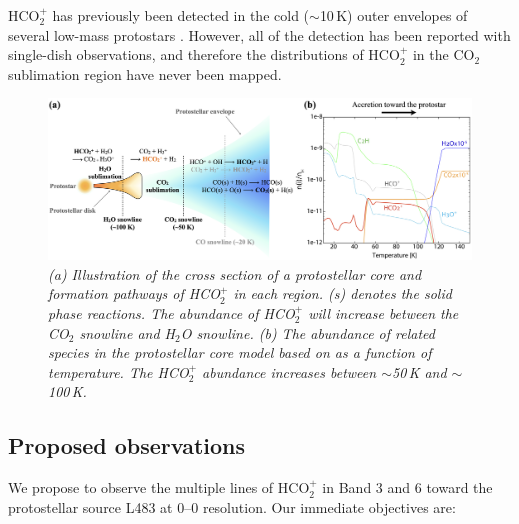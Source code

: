 \documentclass[12pt,a4paper]{article}  %
\newcommand{\carbondioxide}{CO$_2$\xspace}
\newcommand{\protonatedcarbondioxide}{HCO$_2^+$\xspace}
\newcommand{\water}{H$_2$O\xspace}
\begin{document}
\protonatedcarbondioxide has previously been detected in the cold ($\sim$10\,K) outer envelopes of several low-mass protostars \citep[e.g.,][]{Sakai08, Vastel16, Majumdar18}. However, all of the detection has been reported with single-dish observations, and therefore the distributions of \protonatedcarbondioxide in the \carbondioxide sublimation region have never been mapped.

\begin{figure}[th]
    \centering
    \includegraphics[width=\textwidth]{protostellar_core_HCO2p_cartoon_model.png}
    \caption{\em{(a) Illustration of the cross section of a protostellar core and formation pathways of \protonatedcarbondioxide in each region. (s) denotes the solid phase reactions. The abundance of \protonatedcarbondioxide will increase between the \carbondioxide snowline and \water snowline. (b) The abundance of related species in the protostellar core model based on \citet{Aikawa20} as a function of temperature. The \protonatedcarbondioxide abundance increases between $\sim$50\,K and $\sim$100\,K.}}
    \label{fig:protocore_cartoon}
\end{figure}
\vspace{-2em}

\subsection{Proposed observations}
We propose to observe the multiple lines of \protonatedcarbondioxide in Band 3 and 6 toward the protostellar source L483 at 0--0 resolution. Our immediate objectives are:
\end{document}
